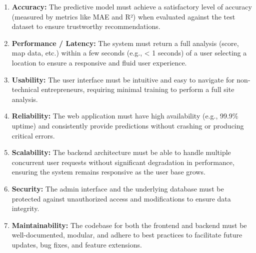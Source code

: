 \begin{enumerate}
    \item[\textbf{a.}] \textbf{Accuracy:} The predictive model must achieve a satisfactory level of accuracy (measured by metrics like MAE  and R²) when evaluated against the test dataset to ensure trustworthy recommendations. %

    \item[\textbf{b.}] \textbf{Performance / Latency:} The system must return a full analysis (score, map data, etc.) within a few seconds (e.g., < 1 seconds) of a user selecting a location to ensure a responsive and fluid user experience.

    \item[\textbf{c.}] \textbf{Usability:} The user interface must be intuitive and easy to navigate for non-technical entrepreneurs, requiring minimal training to perform a full site analysis.

    \item[\textbf{d.}] \textbf{Reliability:} The web application must have high availability (e.g., 99.9\% uptime) and consistently provide predictions without crashing or producing critical errors.

    \item[\textbf{e.}] \textbf{Scalability:} The backend architecture must be able to handle multiple concurrent user requests without significant degradation in performance, ensuring the system remains responsive as the user base grows.

    \item[\textbf{f.}] \textbf{Security:} The admin interface and the underlying database must be protected against unauthorized access and modifications to ensure data integrity.

    \item[\textbf{g.}] \textbf{Maintainability:} The codebase for both the frontend and backend must be well-documented, modular, and adhere to best practices to facilitate future updates, bug fixes, and feature extensions.
\end{enumerate}


